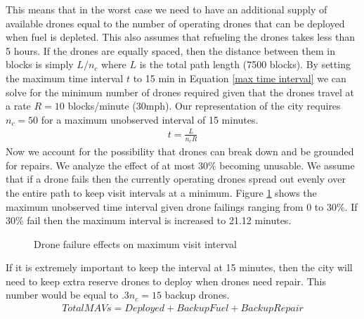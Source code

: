 \documentclass{article}
\begin{document}
This means that in the worst case we need to have an additional supply of available drones equal to the number of operating drones that can be deployed when fuel is depleted. This also assumes that refueling the drones takes less than 5 hours.
\newline If the drones are equally spaced, then the distance between them in blocks is simply $L/n_{c}$ where $L$ is the total path length (7500 blocks). By setting the maximum time interval $t$ to 15 min in Equation \ref{max time interval} we can solve for the minimum number of drones required given that the drones travel at a rate $R = 10$ blocks/minute (30mph). Our representation of the city requires $n_{c} = 50$ for a maximum unobserved interval of 15 minutes.
\begin{eqnarray}
t = \frac{L}{n_{c}R} \label{max time interval}
\end{eqnarray}
\newline Now we account for the possibility that drones can break down and be grounded for repairs. We analyze the effect of at most 30\% becoming unusable. We assume that if a drone fails then the currently operating drones spread out evenly over the entire path to keep visit intervals at a minimum. Figure \ref{failed} shows the maximum unobserved time interval given drone failings ranging from 0 to 30\%. If 30\% fail then the maximum interval is increased to 21.12 minutes.
\begin{figure}[htb!]
    \caption{Drone failure effects on maximum visit interval}
   \label{failed}
\end{figure}
If it is extremely important to keep the interval at 15 minutes, then the city will need to keep extra reserve drones to deploy when drones need repair. This number would be equal to $.3n_{c} = 15$ backup drones.
\begin{eqnarray}
Total MAVs = Deployed + Backup Fuel + Backup Repair \label{totaldrones}
\end{eqnarray}
\end{document}
